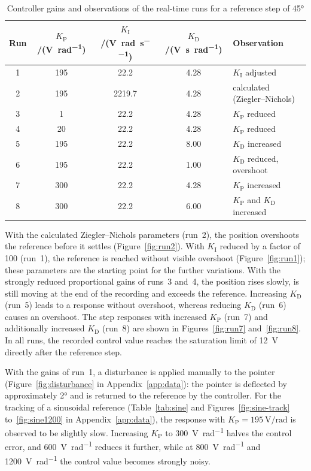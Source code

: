 \begin{table}[H]
  \centering
  \caption[Controller gains of the real-time runs]{Controller gains and
    observations of the real-time runs for a reference step of \ang{45}}
  \label{tab:runs}
  \begin{tabular}{
      S[table-format=1.0]
      S[table-format=3.0]
      S[table-format=4.1]
      S[table-format=1.2]
      l
    }
    \toprule
    {Run} & {$K_\mathrm{P}$/(\unit{\volt\per\radian})}
      & {$K_\mathrm{I}$/(\unit{\volt\per\radian\per\second})}
      & {$K_\mathrm{D}$/(\unit{\volt\second\per\radian})} & Observation \\
     & 195 &   22.2 & 4.28 & $K_\mathrm{I}$ adjusted \\
    2 & 195 & 2219.7 & 4.28 & calculated (Ziegler--Nichols) \\
    3 &   1 &   22.2 & 4.28 & $K_\mathrm{P}$ reduced \\
    4 &  20 &   22.2 & 4.28 & $K_\mathrm{P}$ reduced \\
    5 & 195 &   22.2 & 8.00 & $K_\mathrm{D}$ increased \\
    6 & 195 &   22.2 & 1.00 & $K_\mathrm{D}$ reduced, overshoot \\
    7 & 300 &   22.2 & 4.28 & $K_\mathrm{P}$ increased \\
    8 & 300 &   22.2 & 6.00 & $K_\mathrm{P}$ and $K_\mathrm{D}$ increased \\
    \bottomrule
  \end{tabular}
\end{table}

With the calculated Ziegler--Nichols parameters (run~2), the position overshoots
the reference before it settles (Figure~\ref{fig:run2}). With $K_\mathrm{I}$
reduced by a factor of 100 (run~1), the reference is reached without visible
overshoot (Figure~\ref{fig:run1}); these parameters are the starting point for
the further variations. With the strongly reduced proportional gains of runs~3
and~4, the position rises slowly, is still moving at the end of the recording and
exceeds the reference. Increasing $K_\mathrm{D}$ (run~5) leads to a response
without overshoot, whereas reducing $K_\mathrm{D}$ (run~6) causes an overshoot.
The step responses with increased $K_\mathrm{P}$ (run~7) and additionally
increased $K_\mathrm{D}$ (run~8) are shown in Figures~\ref{fig:run7}
and~\ref{fig:run8}. In all runs, the recorded control value reaches the
saturation limit of \qty{12}{\volt} directly after the reference step.

With the gains of run~1, a disturbance is applied manually to the pointer
(Figure~\ref{fig:disturbance} in Appendix~\ref{app:data}): the pointer is
deflected by approximately \ang{2} and is returned to the reference by the
controller. For the tracking of a sinusoidal reference
(Table~\ref{tab:sine} and Figures~\ref{fig:sine-track} to~\ref{fig:sine1200} in
Appendix~\ref{app:data}), the response with $K_\mathrm{P} = \qty{195}{\volt\per\radian}$
is observed to be slightly slow. Increasing $K_\mathrm{P}$ to
\qty{300}{\volt\per\radian} halves the control error, and
\qty{600}{\volt\per\radian} reduces it further, while at
\qty{800}{\volt\per\radian} and \qty{1200}{\volt\per\radian} the control value
becomes strongly noisy.

